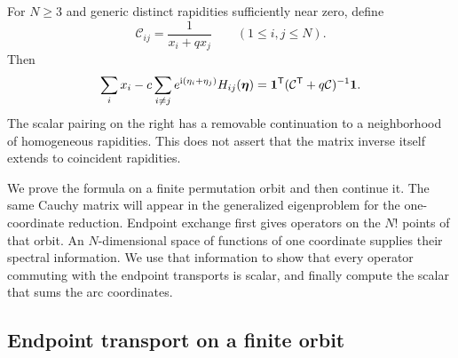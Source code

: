 \begin{proposition}
\label{prop:boundary-inverse}
For $N\ge3$ and generic distinct rapidities sufficiently near zero, define
\[
 \mathcal C_{ij}=\frac1{x_i+q x_j}\qquad(1\le i,j\le N).
\]
Then
\begin{equation}
 \sum_i x_i-c\sum_{i\ne j}e^{\mathrm i(\eta_i+\eta_j)}
 H_{ij}(\boldsymbol\eta)
 ={\bf1}^{\mathsf T}(\mathcal C^{\mathsf T}+q\mathcal C)^{-1}{\bf1}.
 \label{c2:eq-9}
\end{equation}
The scalar pairing on the right has a removable continuation to a
neighborhood of homogeneous rapidities.  This does not assert that the
matrix inverse itself extends to coincident rapidities.
\end{proposition}

We prove the formula on a finite permutation orbit and then continue it.
The same Cauchy matrix will appear in the generalized eigenproblem
for the one-coordinate reduction.  Endpoint exchange first gives operators on the $N!$ points of that orbit.
An $N$-dimensional space of functions of one coordinate supplies their
spectral information.  We use that information to show that every operator
commuting with the endpoint transports is scalar, and finally compute the
scalar that sums the arc coordinates.

\subsection{Endpoint transport on a finite orbit}

